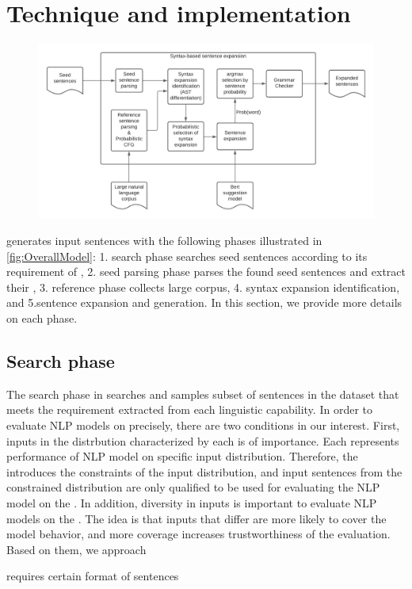 \section{Technique and implementation}

\begin{figure}
  \centering
  \includegraphics[scale=0.5]{figs/overall.pdf}
  \vspace{-5pt}
  \caption{\OverallModelFigCaption}
  \vspace{-10pt}
\end{figure}

\Model generates input sentences with the following phases illustrated
in \ref{fig:OverallModel}: 1. search phase searches seed sentences according to
its requirement of \lc, 2. seed parsing phase parses the found seed
sentences and extract their \cfg, 3. reference phase collects large
corpus, 4. syntax expansion identification, and 5.sentence expansion
and generation. In this section, we provide more details on each phase.

\subsection{Search phase}
The search phase in \Model searches and samples subset of sentences in
the dataset that meets the requirement extracted from each linguistic
capability. In order to evaluate NLP models on \lc precisely, there
are two conditions in our interest. First, inputs in the distrbution
characterized by each \lc is of importance. Each \lc represents
performance of NLP model on specific input distribution. Therefore,
the \lc introduces the constraints of the input distribution, and
input sentences from the constrained distribution are only qualified
to be used for evaluating the NLP model on the \lc. In addition,
diversity in inputs is important to evaluate NLP models on the
\lc. The idea is that inputs that differ are more likely to cover the
\NLP model behavior, and more coverage increases trustworthiness of
the evaluation. Based on them, we approach 


requires certain format of sentences

